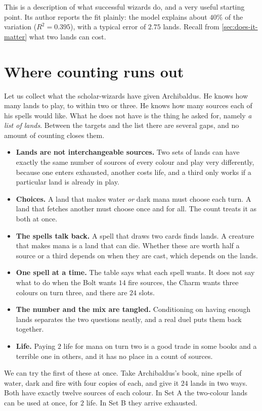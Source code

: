 \documentclass[
    a4paper,
    DIV=13,
    abstract=true,
    numbers=noenddot
]{scrartcl}
\begin{document}
This is a description of what successful wizards do, and a very useful starting point. Its author reports the fit plainly: the model explains about $40\%$ of the variation ($R^2=0.395$), with a typical error of $2.75$ lands. Recall from \cref{sec:does-it-matter} what two lands can cost.

\section{Where counting runs out}
Let us collect what the scholar-wizards have given Archibaldus. He knows how many lands to play, to within two or three. He knows how many sources each of his spells would like. What he does not have is the thing he asked for, namely \emph{a list of lands}. Between the targets and the list there are several gaps, and no amount of counting closes them.
\begin{itemize}
  \item \textbf{Lands are not interchangeable sources.} Two sets of lands can have exactly the same number of sources of every colour and play very differently, because one enters exhausted, another costs life, and a third only works if a particular land is already in play.
  \item \textbf{Choices.} A land that makes water \emph{or} dark mana must choose each turn. A land that fetches another must choose once and for all. The count treats it as both at once.
  \item \textbf{The spells talk back.} A spell that draws two cards finds lands. A creature that makes mana is a land that can die. Whether these are worth half a source or a third depends on when they are cast, which depends on the lands.
  \item \textbf{One spell at a time.} The table says what each spell wants. It does not say what to do when the Bolt wants $14$ fire sources, the Charm wants three colours on turn three, and there are $24$ slots.
  \item \textbf{The number and the mix are tangled.} Conditioning on having enough lands separates the two questions neatly, and a real duel puts them back together.
  \item \textbf{Life.} Paying $2$ life for mana on turn two is a good trade in some books and a terrible one in others, and it has no place in a count of sources.
\end{itemize}

We can try the first of these at once. Take Archibaldus's book, nine spells of water, dark and fire with four copies of each, and give it $24$ lands in two ways. Both have exactly twelve sources of each colour. In Set A the two-colour lands can be used at once, for $2$ life. In Set B they arrive exhausted.
\end{document}
